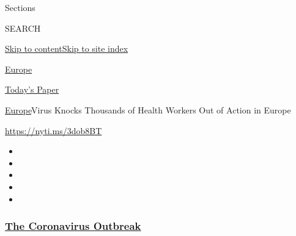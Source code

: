 Sections

SEARCH

\protect\hyperlink{site-content}{Skip to
content}\protect\hyperlink{site-index}{Skip to site index}

\href{https://www.nytimes3xbfgragh.onion/section/world/europe}{Europe}

\href{https://myaccount.nytimes3xbfgragh.onion/auth/login?response_type=cookie\&client_id=vi}{}

\href{https://www.nytimes3xbfgragh.onion/section/todayspaper}{Today's
Paper}

\href{/section/world/europe}{Europe}\textbar{}Virus Knocks Thousands of
Health Workers Out of Action in Europe

\url{https://nyti.ms/3dob8BT}

\begin{itemize}
\item
\item
\item
\item
\item
\end{itemize}

\hypertarget{the-coronavirus-outbreak}{%
\subsubsection{\texorpdfstring{\href{https://www.nytimes3xbfgragh.onion/news-event/coronavirus?name=styln-coronavirus-national\&region=TOP_BANNER\&block=storyline_menu_recirc\&action=click\&pgtype=Article\&impression_id=7b36d270-f4c0-11ea-b722-756f4ec0fc54\&variant=undefined}{The
Coronavirus
Outbreak}}{The Coronavirus Outbreak}}\label{the-coronavirus-outbreak}}

